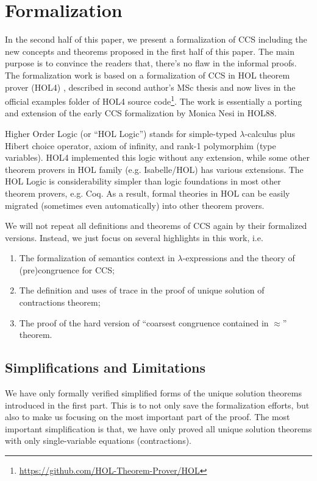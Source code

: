 \section{Formalization}

In the second half of this paper, we present a formalization of CCS
including the new concepts and theorems proposed in the first half of
this paper. The main purpose is to convince the readers that, there's no flaw in the informal proofs. The
formalization work is based on a formalization of CCS in HOL theorem
prover (HOL4) \cite{slind2008brief}, described in second author's MSc thesis
\cite{Tian:2017wrba} and now lives in the official examples folder of HOL4 source
code\footnote{\url{https://github.com/HOL-Theorem-Prover/HOL}}.
The work is essentially a porting and extension of the early CCS
formalization by Monica Nesi \cite{Nesi} in HOL88.

Higher Order Logic (or ``HOL Logic'') \cite{hollogic} stands for simple-typed $\lambda$-calculus plus Hibert
choice operator, axiom of infinity, and rank-1 polymorphim (type
variables). HOL4 implemented this logic without any extension, while
some other theorem provers in HOL family (e.g. Isabelle/HOL) has
various extensions. The HOL Logic is considerability simpler than logic
foundations in most other theorem provers, e.g. Coq. As a result,
formal theories in HOL can be easily migrated (sometimes even
automatically) into other theorem provers.

We will not repeat all definitions and theorems of CCS again by their
formalized versions. Instead, we just focus on several highlights in
this work, i.e.
\begin{enumerate}
\item The formalization of semantics context in $\lambda$-expressions and the theory of
  (pre)congruence for CCS;
\item The definition and uses of trace in the proof of unique solution of
  contractions theorem;
\item The proof of the hard version of ``coarsest congruence
  contained in $\approx$'' theorem.
\end{enumerate}

\subsection{Simplifications and Limitations}

We have only formally verified simplified forms of the unique
solution theorems introduced in the first part. This is to not only
save the formalization efforts, but also to make us focusing on the most
important part of the proof. The most important simplification is
that, we have only proved all unique solution theorems with only single-variable equations
(contractions).

